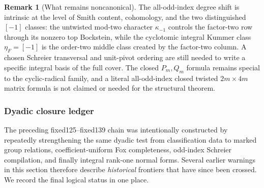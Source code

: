 \documentclass[11pt]{article}
\theoremstyle{definition}
\newtheorem{remark}[theorem]{Remark}
\begin{document}
\begin{remark}[What remains noncanonical]
\label{rem:dyadic-f139-scope}
The all-odd-index degree shift is intrinsic at the
level of Smith content, cohomology, and the
two distinguished $[-1]$ classes:
the untwisted mod-two character
$\kappa_{-1}$ controls the factor-two row through
its nonzero top Bockstein, while the cyclotomic
integral Kummer class $\eta_F=[-1]$ is the
order-two middle class created by the factor-two
column.  A chosen Schreier transversal and unit-pivot
ordering are still needed to write a specific
integral basis of the full cover.
The closed $P_m,Q_m$ formula remains special to the
cyclic-radical family, and a literal all-odd-index
closed twisted $2m\times4m$ matrix formula is not
claimed or needed for the structural theorem.
\end{remark}


\subsubsection{Dyadic closure ledger}
\label{subsubsec:dyadic-f140-closure-ledger}

The preceding fixed125--fixed139 chain was intentionally
constructed by repeatedly strengthening the same dyadic
test from classification data to marked group relations,
coefficient-uniform Fox completeness, odd-index
Schreier compilation, and finally integral rank-one
normal forms.  Several earlier warnings in this section
therefore describe \emph{historical} frontiers that have
since been crossed.  We record the final logical status
in one place.
\end{document}
